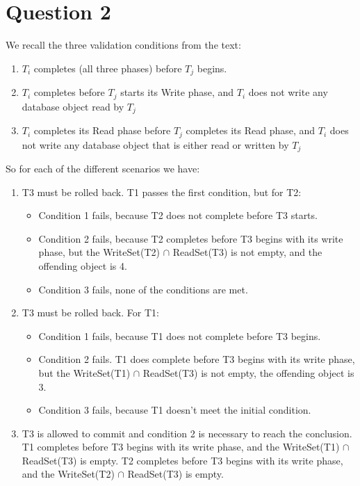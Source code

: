 \documentclass[11pt]{article}
\begin{document}
\section{Question 2}

We recall the three validation conditions from the text:
\begin{enumerate}
  \item
    $T_i$ completes (all three phases) before $T_j$ begins.
  \item
    $T_i$ completes before $T_j$ starts its Write phase, and $T_i$ does not
    write any database object read by $T_j$
  \item
    $T_i$ completes its Read phase before $T_j$ completes its Read phase, and
    $T_i$ does not write any database object that is either read or written by
    $T_j$
\end{enumerate}


So for each of the different scenarios we have:
\begin{enumerate}
		\item
		T3 must be rolled back. T1 passes the first condition, but for T2:
			\begin{itemize}
				\item
				Condition 1 fails, because T2 does not complete before T3 starts.
				\item
				Condition 2 fails, because T2 completes before T3 begins with its write phase, but the 
				WriteSet(T2) $\cap$ ReadSet(T3) is not empty, and the offending object is 4.
				\item
				Condition 3 fails, none of the conditions are met.
			\end{itemize}
		
		\item
		T3 must be rolled back. For T1:
			\begin{itemize}
				\item
				Condition 1 fails, because T1 does not complete before T3 begins.
				\item
				Condition 2 fails. T1 does complete before T3 begins with its write phase, but the 
				WriteSet(T1) $\cap$ ReadSet(T3) is not empty, the offending object is 3.
				\item
				Condition 3 fails, because T1 doesn't meet the initial condition.
			\end{itemize}				
		
		\item
		T3 is allowed to commit and condition 2 is necessary to reach the conclusion. T1 completes before T3 
		begins with its write phase, and the WriteSet(T1) $\cap$ ReadSet(T3) is empty. T2 completes 
		before T3 begins with its write phase, and the WriteSet(T2) $\cap$ ReadSet(T3) is empty.			
	
\end{enumerate}
 
\end{document}
